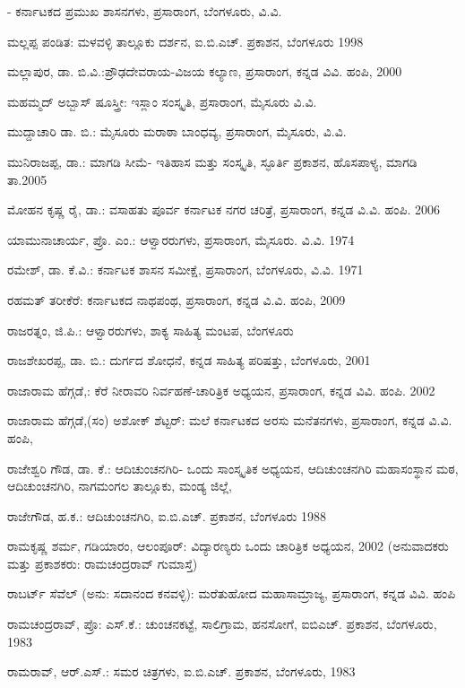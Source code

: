 - ಕರ್ನಾಟಕದ ಪ್ರಮುಖ ಶಾಸನಗಳು, ಪ್ರಸಾರಾಂಗ, ಬೆಂಗಳೂರು, ವಿ.ವಿ.

\noindent
ಮಲ್ಲಪ್ಪ ಪಂಡಿತ: ಮಳವಳ್ಳಿ ತಾಲ್ಲೂಕು ದರ್ಶನ, ಐ.ಬಿ.ಎಚ್​. ಪ್ರಕಾಶನ, ಬೆಂಗಳೂರು 1998

\noindent
ಮಲ್ಲಾಪುರ, ಡಾ. ಬಿ.ವಿ.:ಪ್ರೌಢದೇವರಾಯ-ವಿಜಯ ಕಲ್ಯಾಣ, ಪ್ರಸಾರಾಂಗ, ಕನ್ನಡ ವಿವಿ. ಹಂಪಿ, 2000

\noindent
ಮಹಮ್ಮದ್​ ಅಬ್ಬಾಸ್​ ಷೂಸ್ತ್ರೀ: ಇಸ್ಲಾಂ ಸಂಸ್ಕೃತಿ, ಪ್ರಸಾರಾಂಗ, ಮೈಸೂರು ವಿ.ವಿ.

\noindent
ಮುದ್ದಾಚಾರಿ ಡಾ. ಬಿ.: ಮೈಸೂರು ಮರಾಠಾ ಬಾಂಧವ್ಯ, ಪ್ರಸಾರಾಂಗ, ಮೈಸೂರು, ವಿ.ವಿ. 

\noindent
ಮುನಿರಾಜಪ್ಪ, ಡಾ.: ಮಾಗಡಿ ಸೀಮೆ- ಇತಿಹಾಸ ಮತ್ತು ಸಂಸ್ಕೃತಿ, ಸ್ಫೂರ್ತಿ ಪ್ರಕಾಶನ, ಹೊಸಪಾಳ್ಯ, ಮಾಗಡಿ ತಾ.2005

\noindent
ಮೋಹನ ಕೃಷ್ಣ ರೈ, ಡಾ.: ವಸಾಹತು ಪೂರ್ವ ಕರ್ನಾಟಕ ನಗರ ಚರಿತ್ರೆ, ಪ್ರಸಾರಾಂಗ, ಕನ್ನಡ ವಿ.ವಿ. ಹಂಪಿ. 2006

\noindent
ಯಾಮುನಾಚಾರ್ಯ, ಪ್ರೊ. ಎಂ.: ಆಳ್ವಾರರುಗಳು, ಪ್ರಸಾರಾಂಗ, ಮೈಸೂರು. ವಿ.ವಿ. 1974

\noindent
ರಮೇಶ್​, ಡಾ. ಕೆ.ವಿ.: ಕರ್ನಾಟಕ ಶಾಸನ ಸಮೀಕ್ಷೆ, ಪ್ರಸಾರಾಂಗ, ಬೆಂಗಳೂರು, ವಿ.ವಿ. 1971

\noindent
ರಹಮತ್​ ತರೀಕೆರೆ: ಕರ್ನಾಟಕದ ನಾಥಪಂಥ, ಪ್ರಸಾರಾಂಗ, ಕನ್ನಡ ವಿ.ವಿ. ಹಂಪಿ, 2009

\noindent
ರಾಜರತ್ನಂ, ಜಿ.ಪಿ.: ಆಳ್ವಾರರುಗಳು, ಶಾಕ್ಯ ಸಾಹಿತ್ಯ ಮಂಟಪ, ಬೆಂಗಳೂರು

\noindent
ರಾಜಶೇಖರಪ್ಪ, ಡಾ. ಬಿ.: ದುರ್ಗದ ಶೋಧನೆ, ಕನ್ನಡ ಸಾಹಿತ್ಯ ಪರಿಷತ್ತು, ಬೆಂಗಳೂರು, 2001

\noindent
ರಾಜಾರಾಮ ಹೆಗ್ಗಡೆ,: ಕೆರೆ ನೀರಾವರಿ ನಿರ್ವಹಣೆ-ಚಾರಿತ್ರಿಕ ಅಧ್ಯಯನ, ಪ್ರಸಾರಾಂಗ, ಕನ್ನಡ ವಿವಿ. ಹಂಪಿ. 2002

\noindent
ರಾಜಾರಾಮ ಹೆಗ್ಗಡೆ,(ಸಂ) ಅಶೋಕ್​ ಶೆಟ್ಟರ್​: ಮಲೆ ಕರ್ನಾಟಕದ ಅರಸು ಮನೆತನಗಳು, ಪ್ರಸಾರಾಂಗ, ಕನ್ನಡ ವಿ.ವಿ. ಹಂಪಿ,

\noindent
ರಾಜೇಶ್ವರಿ ಗೌಡ, ಡಾ. ಕೆ.: ಆದಿಚುಂಚನಗಿರಿ- ಒಂದು ಸಾಂಸ್ಕೃತಿಕ ಅಧ್ಯಯನ, ಆದಿಚುಂಚನಗಿರಿ ಮಹಾಸಂಸ್ಥಾನ ಮಠ, ಆದಿಚುಂಚನಗಿರಿ, ನಾಗಮಂಗಲ ತಾಲ್ಲೂಕು, ಮಂಡ್ಯ ಜಿಲ್ಲೆ,

\noindent
ರಾಜೇಗೌಡ, ಹ.ಕ.: ಆದಿಚುಂಚನಗಿರಿ, ಐ.ಬಿ.ಎಚ್​. ಪ್ರಕಾಶನ, ಬೆಂಗಳೂರು 1988

\noindent
ರಾಮಕೃಷ್ಣ ಶರ್ಮ, ಗಡಿಯಾರಂ, ಆಲಂಪೂರ್​: ವಿದ್ಯಾರಣ್ಯರು ಒಂದು ಚಾರಿತ್ರಿಕ ಅಧ್ಯಯನ, 2002 (ಅನುವಾದಕರು ಮತ್ತು ಪ್ರಕಾಶಕರು: ರಾಮಚಂದ್ರರಾವ್​ ಗುಮಾಸ್ತೆ)

\noindent
ರಾಬರ್ಟ್ ಸೆವೆಲ್​ (ಅನು: ಸದಾನಂದ ಕನವಳ್ಳಿ): ಮರೆತುಹೋದ ಮಹಾಸಾಮ್ರಾಜ್ಯ, ಪ್ರಸಾರಾಂಗ, ಕನ್ನಡ ವಿವಿ. ಹಂಪಿ

\noindent
ರಾಮಚಂದ್ರರಾವ್​, ಪ್ರೊ: ಎಸ್​.ಕೆ.: ಚುಂಚನಕಟ್ಟೆ, ಸಾಲಿಗ್ರಾಮ, ಹನಸೋಗೆ, ಐಬಿಎಚ್​. ಪ್ರಕಾಶನ, ಬೆಂಗಳೂರು, 1983

\noindent
ರಾಮರಾವ್​, ಆರ್​.ಎಸ್​.: ಸಮರ ಚಿತ್ರಗಳು, ಐ.ಬಿ.ಎಚ್​. ಪ್ರಕಾಶನ, ಬೆಂಗಳೂರು, 1983

